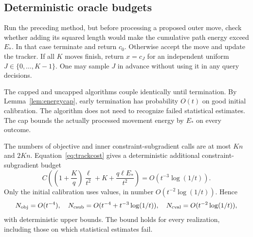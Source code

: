 \documentclass[11pt,a4paper]{article}
\theoremstyle{remark}
\numberwithin{equation}{section}
\begin{document}
\subsection{Deterministic oracle budgets}
Run the preceding method, but before processing a proposed outer move, check whether adding its squared length would make the cumulative path energy exceed $E_*$. In that case terminate and return $c_0$. Otherwise accept the move and update the tracker. If all $K$ moves finish, return $x=c_J$ for an independent uniform $J\in\{0,\ldots,K-1\}$. One may sample $J$ in advance without using it in any query decisions.

The capped and uncapped algorithms couple identically until termination. By Lemma~\ref{lem:energycap}, early termination has probability $O(t)$ on good initial calibration. The algorithm does not need to recognize failed statistical estimates. The cap bounds the actually processed movement energy by $E_*$ on every outcome.

The numbers of objective and inner constraint-subgradient calls are at most $Kn$ and $2Kn$. Equation~\eqref{eq:trackcost} gives a deterministic additional constraint-subgradient budget
\[
 C\left(\left(1+\frac Kq\right)\frac\ell{t^2}+K+
 \frac{q\ell E_*}{t^2}\right)=O(t^{-3}\log(1/t)).
\]
Only the initial calibration uses values, in number $O(t^{-2}\log(1/t))$. Hence
\begin{equation}
 N_{\rm obj}=O(t^{-4}),\quad
 N_{\rm csub}=O(t^{-4}+t^{-3}\log(1/t)),\quad
 N_{\rm cval}=O(t^{-2}\log(1/t)),
 \label{eq:tcounts}
\end{equation}
with deterministic upper bounds. The bound holds for every realization, including those on which statistical estimates fail.
\end{document}
